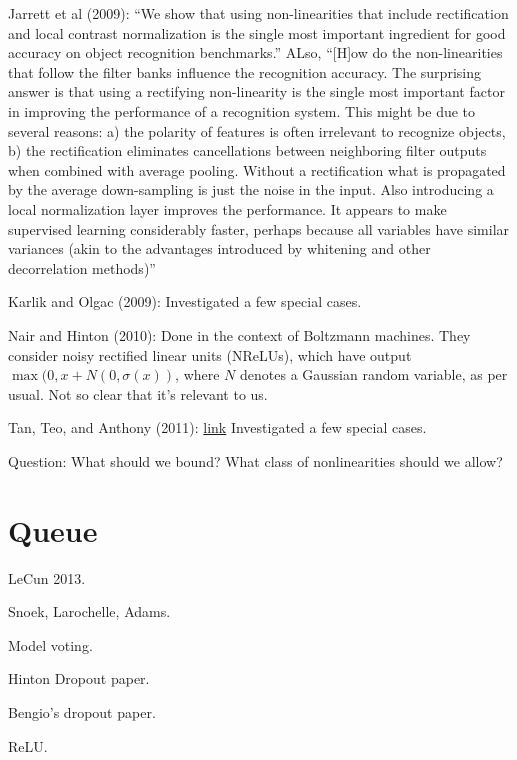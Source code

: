 \documentclass[12pt]{report}
\newcommand{\link}[2]{\href{#1}{#2}}
\begin{document}
Jarrett et al (2009): ``We show that using non-linearities that
include rectification and local contrast normalization is the single
most important ingredient for good accuracy on object recognition
benchmarks.''  ALso, ``[H]ow do the non-linearities that follow the
ﬁlter banks inﬂuence the recognition accuracy. The surprising answer
is that using a rectifying non-linearity is the single most important
factor in improving the performance of a recognition system. This
might be due to several reasons: a) the polarity of features is often
irrelevant to recognize objects, b) the rectiﬁcation eliminates
cancellations between neighboring ﬁlter outputs when combined with
average pooling.  Without a rectiﬁcation what is propagated by the
average down-sampling is just the noise in the input. Also introducing
a local normalization layer improves the performance.  It appears to
make supervised learning considerably faster, perhaps because all
variables have similar variances (akin to the advantages introduced by
whitening and other decorrelation methods)''

Karlik and Olgac (2009): Investigated a few special cases.

Nair and Hinton (2010): Done in the context of Boltzmann machines.
They consider noisy rectified linear units (NReLUs), which have output
$\max(0, x+ N(0, \sigma(x))$, where $N$ denotes a Gaussian random
variable, as per usual.  Not so clear that it's relevant to us.

Tan, Teo, and Anthony (2011):
\link{http://link.springer.com/article/10.1007\%2Fs10462-011-9294-y}{link}
Investigated a few special cases.

Question: What should we bound?  What class of nonlinearities should
we allow?

\chapter{Queue}

LeCun 2013.

Snoek, Larochelle, Adams.

Model voting.

Hinton Dropout paper.

Bengio's dropout paper.

ReLU.
\end{document}
